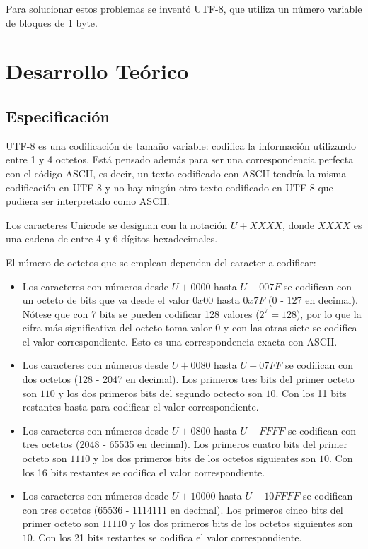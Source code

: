 \documentclass{article}
\begin{document}
Para solucionar estos problemas se inventó UTF-8, que utiliza un número variable de bloques de 1 byte.

\section{Desarrollo Teórico}

\subsection{Especificación}

UTF-8 es una codificación de tamaño variable: codifica la información utilizando entre 1 y 4 octetos. Está pensado además para ser una correspondencia perfecta con el código ASCII, es decir, un texto codificado con ASCII tendría la misma codificación en UTF-8 y no hay ningún otro texto codificado en UTF-8 que pudiera ser interpretado como ASCII.

Los caracteres Unicode se designan con la notación $U+XXXX$, donde $XXXX$ es una cadena de entre 4 y 6 dígitos hexadecimales.

El número de octetos que se emplean dependen del caracter a codificar:

\begin{itemize}
  \item Los caracteres con números desde $U+0000$ hasta $U+007F$ se codifican con un octeto de bits que va desde el valor $0x00$ hasta $0x7F$ (0 - 127 en decimal). Nótese que con 7 bits se pueden codificar 128 valores ($2^7 = 128$), por lo que la cifra más significativa del octeto toma valor 0 y con las otras siete se codifica el valor correspondiente. Esto es una correspondencia exacta con ASCII.
  \item Los caracteres con números desde $U+0080$ hasta $U+07FF$ se codifican con dos octetos (128 - 2047 en decimal). Los primeros tres bits del primer octeto son $110$ y los dos primeros bits del segundo octecto son $10$. Con los 11 bits restantes basta para codificar el valor correspondiente.
  \item Los caracteres con números desde $U+0800$ hasta $U+FFFF$ se codifican con tres octetos (2048 - 65535 en decimal). Los primeros cuatro bits del primer octeto son $1110$ y los dos primeros bits de los octetos siguientes son $10$. Con los 16 bits restantes se codifica el valor correspondiente.
  \item Los caracteres con números desde $U+10000$ hasta $U+10FFFF$ se codifican con tres octetos (65536 - 1114111 en decimal). Los primeros cinco bits del primer octeto son $11110$ y los dos primeros bits de los octetos siguientes son $10$. Con los 21 bits restantes se codifica el valor correspondiente.
\end{itemize}
\end{document}
